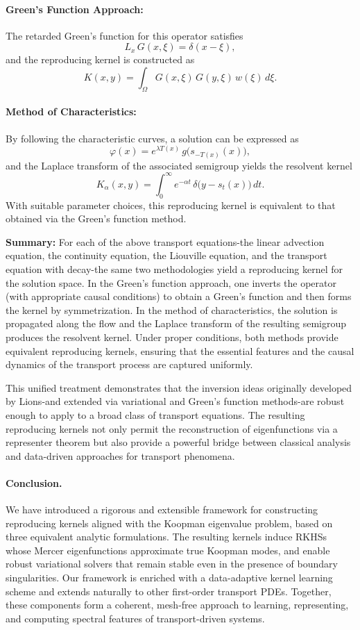 \documentclass[11pt]{article}
\theoremstyle{plain}
\def\[{\begin{equation}}
\def\]{\end{equation}}
\begin{document}
\paragraph{Green's Function Approach:}  
The retarded Green's function for this operator satisfies
\[
L_x\,G(x,\xi)= \delta(x-\xi),
\]
and the reproducing kernel is constructed as
\[
K(x,y)= \int_{\Omega} G(x,\xi)\,G(y,\xi)\,w(\xi)\,d\xi.
\]

\paragraph{Method of Characteristics:}  
By following the characteristic curves, a solution can be expressed as
\[
\varphi(x)= e^{\lambda T(x)}\,g\bigl(s_{-T(x)}(x)\bigr),
\]
and the Laplace transform of the associated semigroup yields the resolvent kernel
\[
K_\alpha(x,y)= \int_{0}^{\infty} e^{-\alpha t}\,\delta\bigl(y-s_t(x)\bigr)\,dt.
\]
With suitable parameter choices, this reproducing kernel is equivalent to that obtained via the Green’s function method.

\medskip

\noindent \textbf{Summary:} For each of the above transport equations-the linear advection equation, the continuity equation, the Liouville equation, and the transport equation with decay-the same two methodologies yield a reproducing kernel for the solution space. In the Green’s function approach, one inverts the operator (with appropriate causal conditions) to obtain a Green's function and then forms the kernel by symmetrization. In the method of characteristics, the solution is propagated along the flow and the Laplace transform of the resulting semigroup produces the resolvent kernel. Under proper conditions, both methods provide equivalent reproducing kernels, ensuring that the essential features and the causal dynamics of the transport process are captured uniformly.

This unified treatment demonstrates that the inversion ideas originally developed by Lions-and extended via variational and Green's function methods-are robust enough to apply to a broad class of transport equations. The resulting reproducing kernels not only permit the reconstruction of eigenfunctions via a representer theorem but also provide a powerful bridge between classical analysis and data-driven approaches for transport phenomena.

\paragraph{Conclusion.}
We have introduced a rigorous and extensible framework for constructing reproducing kernels aligned with the Koopman eigenvalue problem, based on three equivalent analytic formulations. The resulting kernels induce RKHSs whose Mercer eigenfunctions approximate true Koopman modes, and enable robust variational solvers that remain stable even in the presence of boundary singularities. Our framework is enriched with a data-adaptive kernel learning scheme and extends naturally to other first-order transport PDEs. Together, these components form a coherent, mesh-free approach to learning, representing, and computing spectral features of transport-driven systems.
\end{document}
